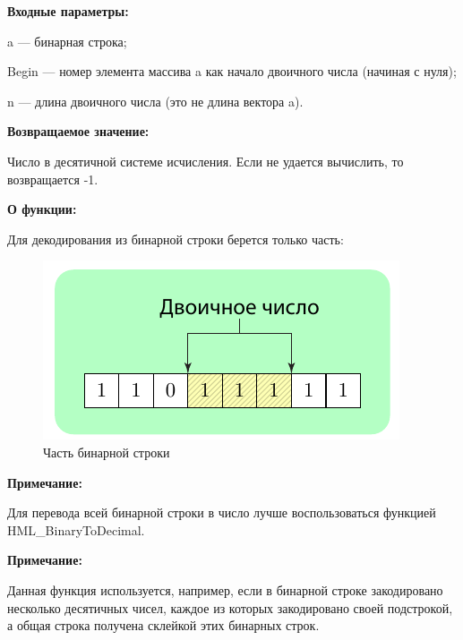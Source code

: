 \textbf{Входные параметры:}
 
 a --- бинарная строка;
 
 Begin --- номер элемента массива a как начало двоичного числа (начиная с нуля);
 
 n --- длина двоичного числа (это не длина вектора a).
 
\textbf{Возвращаемое значение:}

 Число в десятичной системе исчисления. Если не удается вычислить, то возвращается -1.
 
\textbf{О функции:}

 Для декодирования из бинарной строки берется только часть:
 
 \begin{figure} [h]
  \center
  \includegraphics [scale=1] {HML_BinaryToDecimalFromPart_Sheme}
  \caption{Часть бинарной строки} 
  \label{img:HML_BinaryToDecimalFromPart_Sheme}  
\end{figure}
 
 \textbf{Примечание:}
 
 Для перевода всей бинарной строки в число лучше воспользоваться функцией HML\_BinaryToDecimal.

\textbf{Примечание:}

 Данная функция используется, например, если в бинарной строке закодировано несколько десятичных чисел, каждое из которых закодировано своей подстрокой, а общая строка получена склейкой этих бинарных строк.
